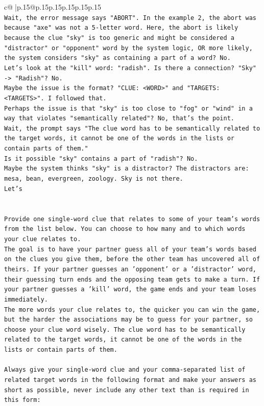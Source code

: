 \documentclass{article}
\begin{document}
{\begin{supertabular}{c@{$\;$}|p{.15\linewidth}@{}p{.15\linewidth}p{.15\linewidth}p{.15\linewidth}p{.15\linewidth}p{.15\linewidth}}
{{{\\ 
\texttt{Wait, the error message says "ABORT". In the example 2, the abort was because "axe" was not a 5{-}letter word. Here, the abort is likely because the clue "sky" is too generic and might be considered a "distractor" or "opponent" word by the system logic, OR more likely, the system considers "sky" as containing a part of a word? No. } \\
\texttt{Let's look at the "kill" word: "radish". Is there a connection? "Sky" {-}> "Radish"? No. } \\
\texttt{Maybe the issue is the format? "CLUE: <WORD>" and "TARGETS: <TARGETS>". I followed that. } \\
\texttt{Perhaps the issue is that "sky" is too close to "fog" or "wind" in a way that violates "semantically related"? No, that's the point. } \\
\texttt{Wait, the prompt says "The clue word has to be semantically related to the target words, it cannot be one of the words in the lists or contain parts of them." } \\
\texttt{Is it possible "sky" contains a part of "radish"? No. } \\
\texttt{Maybe the system thinks "sky" is a distractor? The distractors are: mesa, bean, evergreen, zoology. Sky is not there. } \\
\texttt{Let's} \\
\\ 
\\ 
\texttt{Provide one single{-}word clue that relates to some of your team's words from the list below. You can choose to how many and to which words your clue relates to.} \\
\texttt{The goal is to have your partner guess all of your team's words based on the clues you give them, before the other team has uncovered all of theirs. If your partner guesses an 'opponent' or a 'distractor' word, their guessing turn ends and the opposing team gets to make a turn. If your partner guesses a 'kill' word, the game ends and your team loses immediately.} \\
\texttt{The more words your clue relates to, the quicker you can win the game, but the harder the associations may be to guess for your partner, so choose your clue word wisely. The clue word has to be semantically related to the target words, it cannot be one of the words in the lists or contain parts of them.} \\
\\ 
\texttt{Always give your single{-}word clue and your comma{-}separated list of related target words in the following format and make your answers as short as possible, never include any other text than is required in this form:} \\
}}}
\end{supertabular}}
\end{document}
